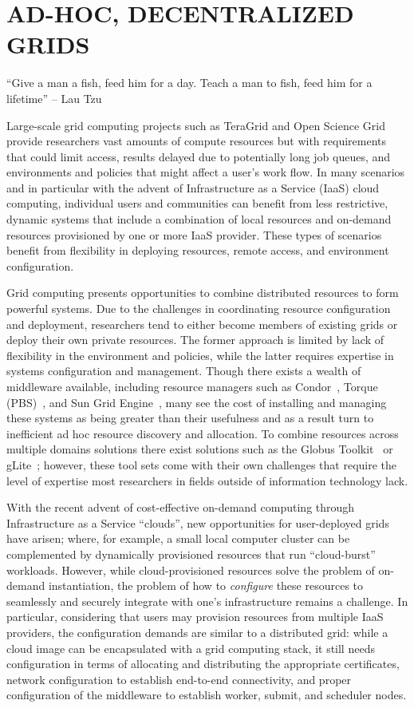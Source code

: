 \chapter{AD-HOC, DECENTRALIZED GRIDS}
\label{chap:gridappliance}

``Give a man a fish, feed him for a day.  Teach a man to fish, feed him for a
lifetime'' -- Lau Tzu

Large-scale grid computing projects such as TeraGrid and Open Science Grid
provide researchers vast amounts of compute resources but with requirements
that could limit access, results delayed due to potentially long job queues,
and environments and policies that might affect a user's work flow. In many
scenarios and in particular with the advent of Infrastructure as a Service
(IaaS) cloud computing, individual users and communities can benefit from less
restrictive, dynamic systems that include a combination of local resources and
on-demand resources provisioned by one or more IaaS provider.  These types of
scenarios benefit from flexibility in deploying resources, remote access, and
environment configuration.

Grid computing presents opportunities to combine distributed resources to form
powerful systems.  Due to the challenges in coordinating resource configuration
and deployment, researchers tend to either become members of existing grids or
deploy their own private resources.  The former approach is limited by lack of
flexibility in the environment and policies, while the latter requires
expertise in systems configuration and management.  Though there exists a
wealth of middleware available, including resource managers such as
Condor~\cite{condor0}, Torque (PBS)~\cite{torque}, and Sun Grid
Engine~\cite{grid_engine}, many see the cost of installing and managing these
systems as being greater than their usefulness and as a result turn to
inefficient ad hoc resource discovery and allocation.  To combine resources
across multiple domains solutions there exist solutions such as the Globus
Toolkit~\cite{globus} or gLite~\cite{glite}; however, these tool sets come with
their own challenges that require the level of expertise most researchers in
fields outside of information technology lack.

With the recent advent of cost-effective on-demand computing through
Infrastructure as a Service ``clouds'', new opportunities for user-deployed
grids have arisen; where, for example, a small local computer cluster can be
complemented by dynamically provisioned resources that run ``cloud-burst''
workloads.  However, while cloud-provisioned resources solve the problem of
on-demand instantiation, the problem of how to {\em configure} these resources
to seamlessly and securely integrate with one's infrastructure remains a
challenge.  In particular, considering that users may provision resources from
multiple IaaS providers, the configuration demands are similar to a distributed
grid: while a cloud image can be encapsulated with a grid computing stack, it
still needs configuration in terms of allocating and distributing the
appropriate certificates, network configuration to establish end-to-end
connectivity, and proper configuration of the middleware to establish worker,
submit, and scheduler nodes.  

